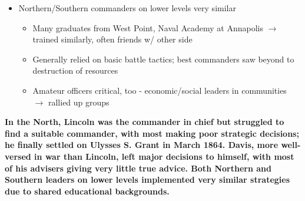 \documentclass[a4paper]{article}
\begin{document}
{\begin{itemize}
\begin{itemize}
        \end{itemize}
        \item Northern/Southern commanders on lower levels very similar
        \begin{itemize}
            \item Many graduates from West Point, Naval Academy at Annapolis $\to$ trained similarly, often friends w/ other side
            \item Generally relied on basic battle tactics; best commanders saw beyond to destruction of resources 
            \item Amateur officers critical, too - economic/social leaders in communities $\to$ rallied up groups 
        \end{itemize}
    \end{itemize}
    \textbf{In the North, Lincoln was the commander in chief but struggled to find a suitable commander, with most making poor strategic decisions; he finally settled on Ulysses S. Grant in March 1864. Davis, more well-versed in war than Lincoln, left major decisions to himself, with most of his advisers giving very little true advice. Both Northern and Southern leaders on lower levels implemented very similar strategies due to shared educational backgrounds.}}
\end{document}
